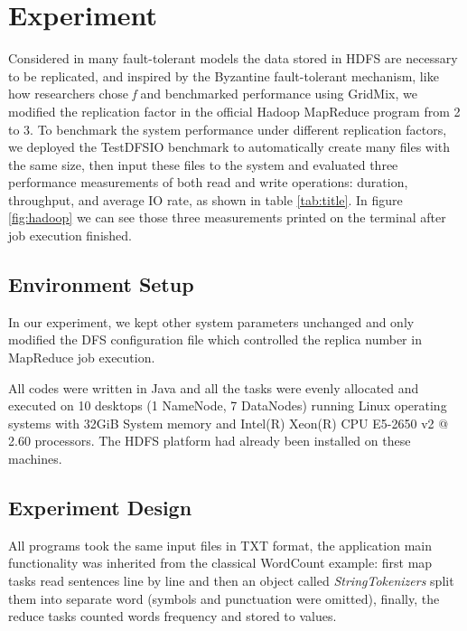 \documentclass[11pt,twocolumn]{article}
\begin{document}
\section{Experiment}
Considered in many fault-tolerant models the data stored in HDFS are necessary to be replicated, and inspired by the Byzantine fault-tolerant mechanism, like how researchers chose \textit{f} and benchmarked performance using GridMix, we modified the replication factor in the official Hadoop MapReduce program from 2 to 3. To benchmark the system performance under different replication factors, we deployed the TestDFSIO benchmark\cite{testdfsio} to automatically create many files with the same size, then input these files to the system and evaluated three performance measurements of both read and write operations: duration, throughput, and average IO rate, as shown in table \ref{tab:title}. In figure \ref{fig:hadoop} we can see those three measurements printed on the terminal after job execution finished.
\begin{table}[ht]
\centering
\caption{Conditions and measurements in our experiment.}
 \label{tab:title} 
 \end{table}
\subsection*{Environment Setup}
In our experiment, we kept other system parameters unchanged and only modified the DFS configuration file which controlled the replica number in MapReduce job execution.\par

All codes were written in Java and all the tasks were evenly allocated and executed on 10 desktops (1 NameNode, 7 DataNodes) running Linux operating systems with 32GiB System memory and Intel(R) Xeon(R) CPU E5-2650 v2 @ 2.60 processors. The HDFS platform had already been installed on these machines.

\subsection*{Experiment Design}
All programs took the same input files in TXT format, the application main functionality was inherited from the classical WordCount example: first map tasks read sentences line by line and then an object called \textit{StringTokenizers} split them into separate word (symbols and punctuation were omitted), finally, the reduce tasks counted words frequency and stored to values.
\end{document}
